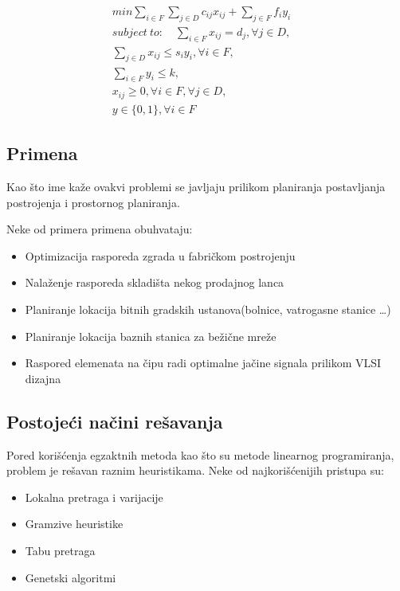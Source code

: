 \documentclass[a4paper]{article}
\begin{document}
\begin{align}
min \sum_{i \in F}\sum_{j \in D}c_{ij}x_{ij} + \sum_{j \in F}f_iy_i\\
 subject\: to: 
\quad \sum_{i \in F}x_{ij} = d_j, \forall j \in D,\quad\\
 \sum_{j \in D}x_{ij} \le s_iy_i, \forall i \in F,\\
\sum_{i \in F}y_i \le k,\\
x_{ij} \ge 0, \forall i \in F,\forall j \in D,\\
y \in \{ 0 , 1 \}, \forall i \in F
\end{align}

\subsection{Primena}

Kao što ime kaže ovakvi problemi se javljaju prilikom planiranja postavljanja postrojenja i prostornog planiranja.

Neke od primera primena obuhvataju\cite{tokyo}:
\begin{itemize}
\item  Optimizacija rasporeda zgrada u fabričkom postrojenju
\item Nalaženje rasporeda skladišta nekog prodajnog lanca
\item Planiranje lokacija bitnih gradskih ustanova(bolnice, vatrogasne stanice \ldots)
\item Planiranje lokacija baznih stanica za bežične mreže
\item Raspored elemenata na čipu radi optimalne jačine signala prilikom VLSI dizajna
\end{itemize}

\subsection{Postojeći načini rešavanja}

Pored korišćenja egzaktnih metoda kao što su metode linearnog programiranja, problem je rešavan raznim heuristikama. Neke od najkorišćenijih pristupa su\cite{Silva}:
\begin{itemize}
\item Lokalna pretraga i varijacije
\item Gramzive heuristike
\item Tabu pretraga
\item Genetski algoritmi
\end{itemize}
\end{document}

